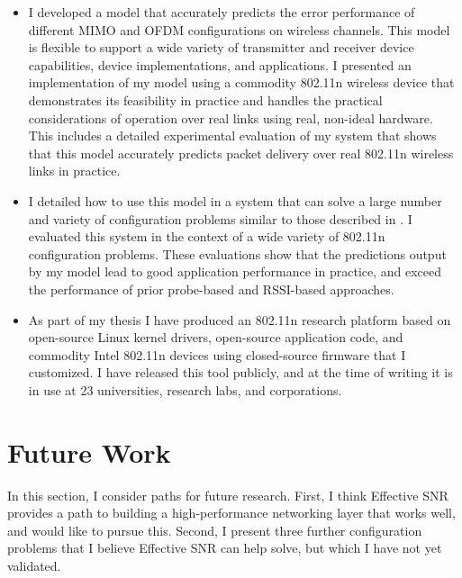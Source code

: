\begin{itemize}[leftmargin=0.5cm,parsep=1ex,itemsep=1ex,topsep=1ex]
\item I developed a model that accurately predicts the error performance of different MIMO and OFDM configurations on wireless channels. This model is flexible to support a wide variety of transmitter and receiver device capabilities, device implementations, and applications. I presented an implementation of my model using a commodity 802.11n wireless device that demonstrates its feasibility in practice and handles the practical considerations of operation over real links using real, non-ideal hardware. This includes a detailed experimental evaluation of my system that shows that this model accurately predicts packet delivery over real 802.11n wireless links in practice.

\item I detailed how to use this model in a system that can solve a large number and variety of configuration problems similar to those described in . I evaluated this system in the context of a wide variety of 802.11n configuration problems.
These evaluations show that the predictions output by my model lead to good application performance in practice, and exceed the performance of prior probe-based and RSSI-based approaches.

\item As part of my thesis I have produced an 802.11n research platform based on open-source Linux kernel drivers, open-source application code, and commodity Intel 802.11n devices using closed-source firmware that I customized.
I have released this tool publicly, and at the time of writing it is in use at 23 universities, research labs, and corporations.
\end{itemize}

\section{Future Work}
In this section, I consider paths for future research. First, I think Effective SNR provides a path to building a high-performance networking layer that works well, and would like to pursue this. Second, I present three further configuration problems that I believe Effective SNR can help solve, but which I have not yet validated.

